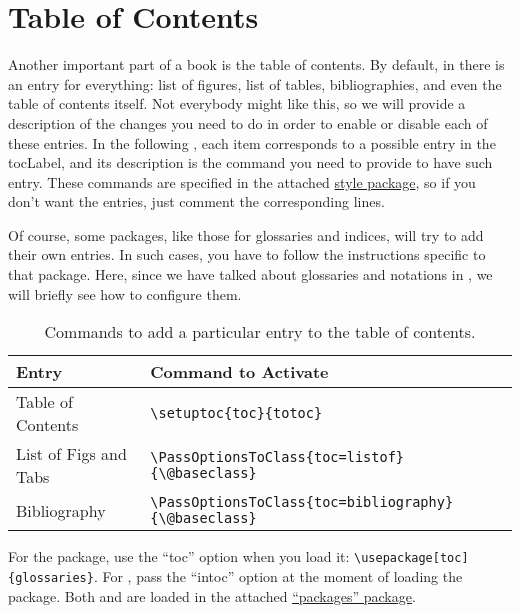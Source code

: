 \section{Table of Contents}

Another important part of a book is the table of contents. By default, 
in  there is an entry for everything: list of figures, 
list of tables, bibliographies, and even the table of contents itself. 
Not everybody might like this, so we will provide a description of the 
changes you need to do in order to enable or disable each of these 
entries. In the following , each item corresponds to 
a possible entry in the \acrshort{tocLabel}, and its description is the 
command you need to provide to have such entry. These commands are 
specified in the attached \href{style/style.sty}{style 
package}, so if you don't want the entries, just comment the 
corresponding lines.

Of course, some packages, like those for glossaries and indices, will 
try to add their own entries. In such cases, you have to follow the 
instructions specific to that package. Here, since we have talked about 
glossaries and notations in , we will briefly see how
to configure them.

\begin{table}
\footnotesize
\caption{Commands to add a particular entry to the table of contents.}
\begin{tabular}{ l l }
	\toprule
	Entry & Command to Activate \\
	\midrule
	Table of Contents & \lstinline|\setuptoc{toc}{totoc}| \\
	List of Figs and Tabs & \lstinline|\PassOptionsToClass{toc=listof}{\@baseclass}| \\
	Bibliography & \lstinline|\PassOptionsToClass{toc=bibliography}{\@baseclass}| \\
	\bottomrule
\end{tabular}
\end{table}

For the  package, use the \enquote{toc} option when 
you load it: \lstinline|\usepackage[toc]{glossaries}|. For 
, pass the \enquote{intoc} option at the moment of 
loading the package. Both  and  are 
loaded in the attached \href{style/packages.sty}{\enquote{packages} 
package}.

